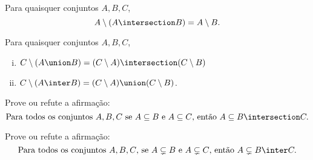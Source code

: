 \begin{exercise}
    Para quaisquer conjuntos $A,B,C$,
    $$
        A \setminus (A \intersection B) = A \setminus B.
    $$
\end{exercise}

\begin{exercise}
    Para quaisquer conjuntos $A,B,C$,
    \begin{enumerate}[(i)]
        \item $C \setminus (A \union B) = (C \setminus A) \intersection (C \setminus B)$
        \item $C \setminus (A \inter B) = (C \setminus A) \union (C \setminus B)$.
    \end{enumerate}
\end{exercise}

\begin{exercise}
    Prove ou refute a afirmação:
    $$
        \text {Para todos os conjuntos } A,B,C \text{ se } A \subseteq B \text{ e } A \subseteq C \text{, então }  A \subseteq B \intersection C.
    $$
\end{exercise}

\begin{homework}
    Prove ou refute a afirmação:
    $$
        \text{Para todos os conjuntos } A,B,C \text{, se } A \subsetneq B \text{ e } A \subsetneq C \text{, então } A \subsetneq B \inter C.
    $$
\end{homework}
